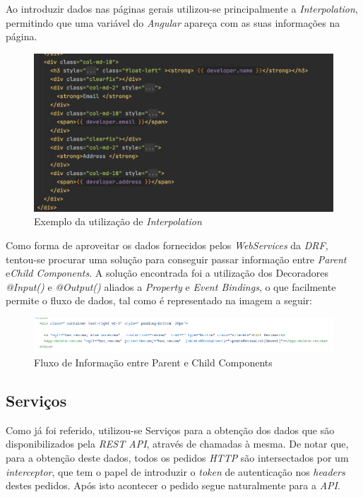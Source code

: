 \documentclass[10pt,english]{article}
\begin{document}
\clearpage
\par Ao introduzir dados nas páginas gerais utilizou-se principalmente a \textit{Interpolation}, permitindo que uma variável do \textit{Angular} apareça com as suas informações na página.


\begin{figure}[!h]
        \centering
        \includegraphics[width=\textwidth]{images/show_dev.png}
        \caption{Exemplo da utilização de \textit{Interpolation}}
        
\end{figure}

\clearpage

\par Como forma de aproveitar os dados fornecidos pelos \textit{WebServices} da \textit{DRF}, tentou-se procurar uma solução para conseguir passar informação entre \textit{Parent} e\textit{Child Components}. A solução encontrada foi a utilização dos Decoradores \textit{@Input()} e \textit{@Output()} aliados a \textit{Property} e \textit{Event Bindings}, o que facilmente permite o fluxo de dados, tal como é representado na imagem a seguir:
\begin{figure}[!h]
        \centering
        \includegraphics[width=\textwidth]{images/parent-child.png}
        \caption{Fluxo de Informação entre Parent e Child Components}
\end{figure}

\clearpage

\subsection{Serviços}
Como já foi referido,  utilizou-se Serviços para a obtenção dos dados que são disponibilizados pela \textit{REST API}, através de chamadas à mesma. De notar que, para a obtenção deste dados, todos os pedidos \textit{HTTP} são intersectados por um \textit{interceptor}, que tem o papel de introduzir o \textit{token} de autenticação nos \textit{headers} destes pedidos. Após isto acontecer o pedido segue naturalmente para a \textit{API}. 
\end{document}
